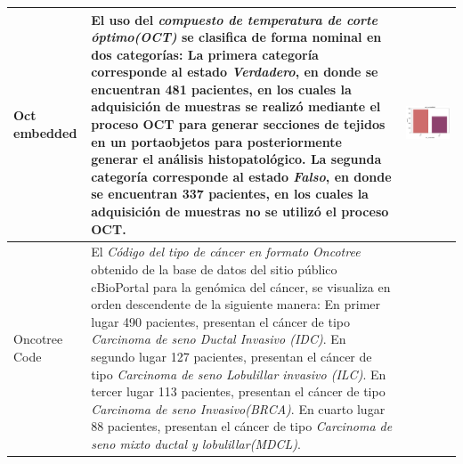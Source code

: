 \begin{table}[!htb]
	\footnotesize
	\begin{threeparttable}
		\begin{tabular}{p{2.5cm} p{7cm} p{6.5cm}} \toprule
			
			Oct embedded
			& El uso del \textit{compuesto de temperatura de corte óptimo(OCT)} se clasifica de forma nominal en dos categorías: La primera categoría corresponde al estado \textit{Verdadero}, en donde se encuentran 481 pacientes, en los cuales la adquisición de muestras se realizó mediante el proceso OCT para generar secciones de tejidos en un portaobjetos para posteriormente generar el análisis histopatológico. La segunda categoría corresponde al estado \textit{Falso}, en donde se encuentran 337 pacientes, en los cuales la adquisición de muestras no se utilizó el proceso OCT.
			& \begin{center}\includegraphics[width=1\linewidth]{NOTEBOOK/IMAGENES_DESCRIPTIVAS/30_oct_embedded}\end{center}
			\\ \hline
			
			Oncotree Code
			& El \textit{Código del tipo de cáncer en formato Oncotree} obtenido de la base de datos del sitio público cBioPortal para la genómica del cáncer, se visualiza en orden descendente de la siguiente manera: En primer lugar 490 pacientes, presentan el cáncer de tipo \textit{Carcinoma de seno Ductal Invasivo (IDC)}. En segundo lugar 127 pacientes, presentan el cáncer de tipo \textit{Carcinoma de seno Lobulillar invasivo (ILC)}. En tercer lugar 113 pacientes, presentan el cáncer de tipo \textit{Carcinoma de seno Invasivo(BRCA)}. En cuarto lugar 88 pacientes, presentan el cáncer de tipo \textit{Carcinoma de seno mixto ductal y lobulillar(MDCL)}.
			

\end{tabular}
\end{threeparttable}
\end{table}

